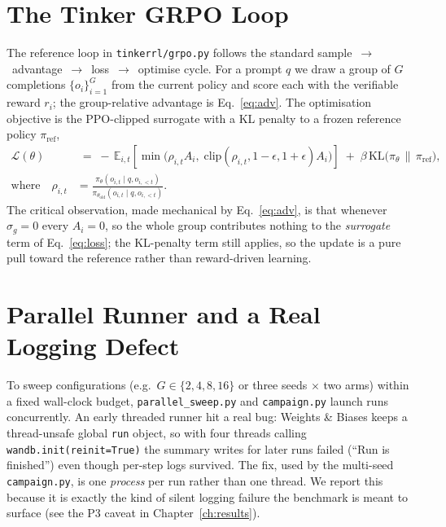 \documentclass[12pt,a4paper]{report}
\begin{document}
\section{The Tinker GRPO Loop}
\label{sec:impl-loop}


The reference loop in \texttt{tinkerrl/grpo.py} follows the standard
sample~$\rightarrow$~advantage~$\rightarrow$~loss~$\rightarrow$~optimise cycle. For a
prompt $q$ we draw a group of $G$ completions $\{o_i\}_{i=1}^{G}$ from the current
policy and score each with the verifiable reward $r_i$; the group-relative advantage
is Eq.~\eqref{eq:adv}. The optimisation objective is the PPO-clipped surrogate with
a KL penalty to a frozen reference policy $\pi_{\mathrm{ref}}$,
\begin{align}
\mathcal{L}(\theta) &\;=\;
-\,\mathbb{E}_{i,t}\!\left[
\min\!\big(\rho_{i,t}A_i,\;
\mathrm{clip}(\rho_{i,t},1-\epsilon,1+\epsilon)A_i\big)
\right]
\;+\; \beta\, \mathrm{KL}\!\big(\pi_\theta \,\|\, \pi_{\mathrm{ref}}\big),
\label{eq:loss}\\[0.2em]
\text{where}\quad
\rho_{i,t} &=\frac{\pi_\theta(o_{i,t}\mid q,o_{i,<t})}{\pi_{\theta_{\mathrm{old}}}(o_{i,t}\mid q,o_{i,<t})}.
\nonumber
\end{align}
The critical observation, made mechanical by Eq.~\eqref{eq:adv}, is that whenever
$\sigma_g = 0$ every $A_i = 0$, so the whole group contributes nothing to the
\emph{surrogate} term of Eq.~\eqref{eq:loss}; the KL-penalty term still applies, so
the update is a pure pull toward the reference rather than reward-driven learning.

\section{Parallel Runner and a Real Logging Defect}
\label{sec:runner}
To sweep configurations (e.g.\ $G \in \{2,4,8,16\}$ or three seeds $\times$ two arms)
within a fixed wall-clock budget, \texttt{parallel\_sweep.py} and \texttt{campaign.py}
launch runs concurrently. An early threaded runner hit a real bug: Weights \& Biases
keeps a thread-unsafe global \texttt{run} object, so with four threads calling
\texttt{wandb.init(reinit=True)} the summary writes for later runs failed (``Run is
finished'') even though per-step logs survived. The fix, used by the multi-seed
\texttt{campaign.py}, is one \emph{process} per run rather than one thread. We report
this because it is exactly the kind of silent logging failure the benchmark is meant
to surface (see the P3 caveat in Chapter~\ref{ch:results}).
\end{document}
